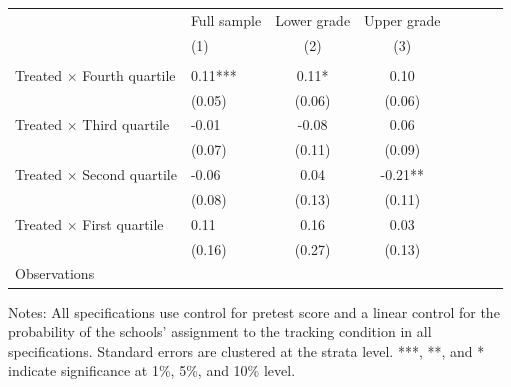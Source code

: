 \begin{center} 
\caption{\small Differential effect of baseline achievement quartiles} 
\label{tab:hetfx} 
\begin{small}
\begin{threeparttable}
\begin{tabular} {@{} l l c c c c c c  @{}} \toprule \toprule
& Full sample & Lower grade & Upper grade  \\
& (1) & (2) & (3) \\ \midrule 
\\
 Treated $\times$ Fourth quartile      &  0.11***  &  0.11*  &  0.10   \\
             &  (0.05)  &  (0.06)  &  (0.06)   \\
 Treated $\times$ Third quartile      &  -0.01  &  -0.08  &  0.06   \\
             &  (0.07)  &  (0.11)  &  (0.09)   \\
 Treated $\times$ Second quartile      &  -0.06  &  0.04  &  -0.21**   \\
             &  (0.08)  &  (0.13)  &  (0.11)   \\
 Treated $\times$ First quartile      &  0.11  &  0.16  &  0.03   \\
             &  (0.16)  &  (0.27)  &  (0.13)   \\
\midrule
Observations   \\
\bottomrule
\end{tabular}
\begin{tablenotes}
\item Notes: All specifications use control for pretest score and a linear control for the probability of the schools’ assignment to the tracking condition in all specifications. Standard errors are clustered at the strata level.  ***, **, and * indicate significance at 1\%, 5\%, and 10\% level. \end{tablenotes}
\end{threeparttable}
\end{small}
\end{center}
\clearpage
